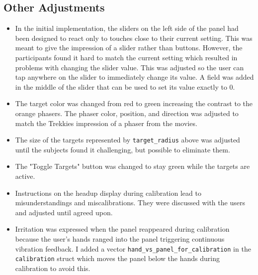 \documentclass[hyperref, bachelorofscience]{cgvpub}
\begin{document}
\subsection{Other Adjustments}
\vspace{.3cm}
\begin{itemize}
	\item In the initial implementation, the sliders on the left side of the panel had been designed to react only to touches close to their current setting. This was meant to give the impression of a slider rather than buttons. However, the participants found it hard to match the current setting which resulted in problems with changing the slider value. This was adjusted so the user can tap anywhere on the slider to immediately change its value. A field was added in the middle of the slider that can be used to set its value exactly to $ 0 $. 
	\item The target color was changed from red to green increasing the contrast to the orange phasers. The phaser color, position, and direction was adjusted to match the Trekkies impression of a phaser from the movies.
	\item The size of the targets represented by \lstinline|target_radius| above was adjusted until the subjects found it challenging, but possible to eliminate them.
	\item The "Toggle Targets" button was changed to stay green while the targets are active.
	\item Instructions on the headup display during calibration lead to misunderstandings and miscalibrations. They were discussed with the users and adjusted until agreed upon.
	\item Irritation was expressed when the panel reappeared during calibration because the user's hands ranged into the panel triggering continuous vibration feedback. I added a vector \lstinline|hand_vs_panel_for_calibration| in the \lstinline|calibration| struct which moves the panel below the hands during calibration to avoid this.
\end{itemize}



\printglossary[type=gloss_terms]
\printglossary[type=gloss_acr]
\end{document}
